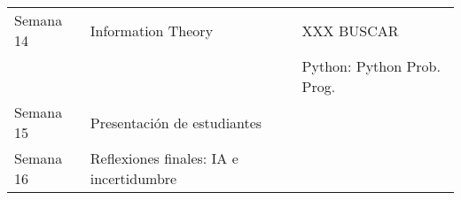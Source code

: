 \documentclass[letterpaper]{inzane_syllabus} %
\begin{document}
\begin{center}
\begin{tabularx}{\textwidth}{p{2cm}p{8cm}p{9.5cm}}
\arrayrulecolor{maingray}\hline
Semana 14 & Information Theory & XXX BUSCAR \\ & & Python: Python Prob. Prog. \\

\arrayrulecolor{maingray}\hline
Semana 15 & Presentaci\'on de estudiantes \\

\arrayrulecolor{maingray}\hline
Semana 16 & Reflexiones finales: IA e incertidumbre \\
\hline

\end{tabularx}
\end{center}


\end{document}
